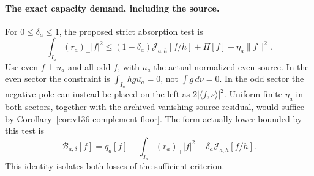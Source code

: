 \paragraph{The exact capacity demand, including the source.}
For $0\le\delta_a\le1$, the proposed strict absorption test is
\begin{equation}\label{eq:v150-capacity-demand}
 \int_{I_a}(r_a)_-|f|^2\le
 (1-\delta_a)\mathcal J_{a,h}[f/h]+\Pi[f]+\eta_a\|f\|^2.
\end{equation}
Use even $f\perp u_a$ and all odd $f$, with $u_a$ the actual normalized
even source. In the even sector the constraint is
$\int_{I_a}h g\overline{u_a}=0$, not $\int g\,d\nu=0$.
In the odd sector the negative pole can instead be placed on the left
as $2|\langle f,s\rangle|^2$. Uniform finite $\eta_a$ in both sectors,
together with the archived vanishing source residual, would suffice
by Corollary~\ref{cor:v136-complement-floor}.
The form actually lower-bounded by this test is
\begin{equation}\label{eq:v150-budget-form}
 \mathcal B_{a,\delta}[f]
 =q_a[f]-\int_{I_a}(r_a)_+|f|^2
                  -\delta_a\mathcal J_{a,h}[f/h].
\end{equation}
This identity isolates both losses of the sufficient criterion.

